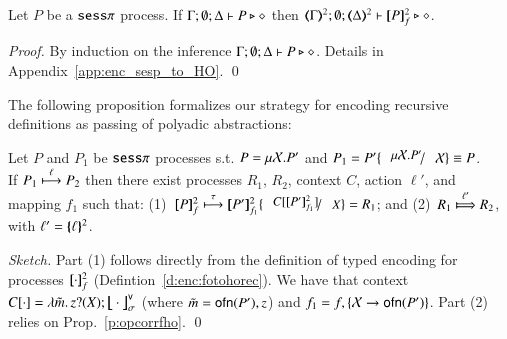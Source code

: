 

\begin{proposition}\label{prop:typepres2}
Let $P$ be a  $\mathtt{sess}\pi$ process.
If			$\Gamma; \emptyset; \Delta \vdash P \triangleright \diamond$ then 
			$\mapt{\Gamma}^{2}; \emptyset; \mapt{\Delta}^{2} \proves \map{P}_f^{2} \hastype \Proc$. 
\end{proposition}

\begin{proof}
By induction on the inference $\Gamma; \emptyset; \Delta \vdash P \triangleright \diamond$. 
Details in Appendix~\ref{app:enc_sesp_to_HO}.
	\qed
\end{proof}


The following proposition formalizes our strategy  for encoding recursive definitions
as passing of polyadic abstractions:
\begin{proposition}
Let $P$ and $P_1$ be $\mathtt{sess}\pi$ processes s.t. $P =\mu \mathcal{X}. P'$ and $P_1 = P'\subst{\recp{X}{P'}}{\rvar{X}} \scong P$. \\
If $P_1 \stackrel{\ell}{\longmapsto} P_2$ then there exist
processes $R_1$, $R_2$,
context $C$, 
action $\ell'$,
and 
mapping $f_1$
such that: 
(1)~$\map{P}_f^{2} \hby{\tau} \map{P'}_{f_1}^{2}\subst{\context{C}{\map{P'}_{f_1}^{2}}}{X} = R_1$; and
(2)~$R_1 \Hby{\ell'} R_2$, with $\ell' = \{\!\!\{\ell\}\!\!\}^{2}$.
\end{proposition}

\begin{proof}[Sketch]
Part (1) follows directly from the definition of typed encoding for processes $[\!\![\cdot]\!\!]_f^{2}$
(Defintion~\ref{d:enc:fotohorec}).
We have that 
context $C[\cdot] = \lambda \tilde{m}.\,z ? (X) ;\big\lfloor\!\!\big\lfloor\cdot\big\rfloor\!\!\big\rfloor^\mathsf{v}_\sigma$
(where $\tilde{m} = \mathsf{ofn}(P'),z$)
and
$f_1 = f, \{\mathcal{X} \to \mathsf{ofn}(P')\}$.
Part (2) relies on  Prop.~\ref{p:opcorrfho}.
\qed
\end{proof}

